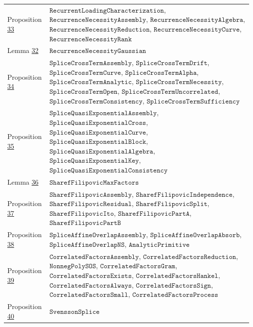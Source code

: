 \documentclass[11pt]{article}
\begin{document}
{\begin{longtable}{lP{384pt}}
Proposition \hyperref[res:Proposition-33]{33} & \(\texttt{RecurrentLoadingCharacterization}\), \(\texttt{RecurrenceNecessityAssembly}\), \(\texttt{RecurrenceNecessityAlgebra}\), \(\texttt{RecurrenceNecessityReduction}\), \(\texttt{RecurrenceNecessityCurve}\), \(\texttt{RecurrenceNecessityRank}\) \\
Lemma \hyperref[res:Lemma-32]{32} & \(\texttt{RecurrenceNecessityGaussian}\) \\
Proposition \hyperref[res:Proposition-34]{34} & \(\texttt{SpliceCrossTermAssembly}\), \(\texttt{SpliceCrossTermDrift}\), \(\texttt{SpliceCrossTermCurve}\), \(\texttt{SpliceCrossTermAlpha}\), \(\texttt{SpliceCrossTermAnalytic}\), \(\texttt{SpliceCrossTermNecessity}\), \(\texttt{SpliceCrossTermOpen}\), \(\texttt{SpliceCrossTermUncorrelated}\), \(\texttt{SpliceCrossTermConsistency}\), \(\texttt{SpliceCrossTermSufficiency}\) \\
Proposition \hyperref[res:Proposition-35]{35} & \(\texttt{SpliceQuasiExponentialAssembly}\), \(\texttt{SpliceQuasiExponentialCross}\), \(\texttt{SpliceQuasiExponentialCurve}\), \(\texttt{SpliceQuasiExponentialBlock}\), \(\texttt{SpliceQuasiExponentialAlgebra}\), \(\texttt{SpliceQuasiExponentialKey}\), \(\texttt{SpliceQuasiExponentialConsistency}\) \\
Lemma \hyperref[res:Lemma-36]{36} & \(\texttt{SharefFilipovicMaxFactors}\) \\
Proposition \hyperref[res:Proposition-37]{37} & \(\texttt{SharefFilipovicAssembly}\), \(\texttt{SharefFilipovicIndependence}\), \(\texttt{SharefFilipovicResidual}\), \(\texttt{SharefFilipovicSplit}\), \(\texttt{SharefFilipovicIto}\), \(\texttt{SharefFilipovicPartA}\), \(\texttt{SharefFilipovicPartB}\) \\
Proposition \hyperref[res:Proposition-38]{38} & \(\texttt{SpliceAffineOverlapAssembly}\), \(\texttt{SpliceAffineOverlapAbsorb}\), \(\texttt{SpliceAffineOverlapNS}\), \(\texttt{AnalyticPrimitive}\) \\
Proposition \hyperref[res:Proposition-39]{39} & \(\texttt{CorrelatedFactorsAssembly}\), \(\texttt{CorrelatedFactorsReduction}\), \(\texttt{NonnegPolySOS}\), \(\texttt{CorrelatedFactorsGram}\), \(\texttt{CorrelatedFactorsExists}\), \(\texttt{CorrelatedFactorsHankel}\), \(\texttt{CorrelatedFactorsAlways}\), \(\texttt{CorrelatedFactorsSign}\), \(\texttt{CorrelatedFactorsSmall}\), \(\texttt{CorrelatedFactorsProcess}\) \\
Proposition \hyperref[res:Proposition-40]{40} & \(\texttt{SvenssonSplice}\) \\

\end{longtable}}
\end{document}
